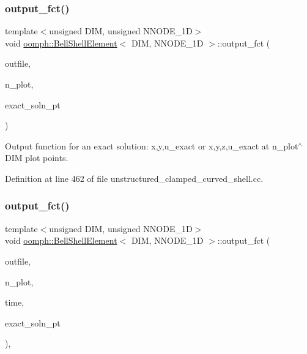 \subsubsection{\texorpdfstring{output\+\_\+fct()}{output\_fct()}\hspace{0.1cm}{\footnotesize\ttfamily [1/2]}}
{\footnotesize\ttfamily template$<$unsigned D\+IM, unsigned N\+N\+O\+D\+E\+\_\+1D$>$ \\
void \hyperlink{classoomph_1_1BellShellElement}{oomph\+::\+Bell\+Shell\+Element}$<$ D\+IM, N\+N\+O\+D\+E\+\_\+1D $>$\+::output\+\_\+fct (\begin{DoxyParamCaption}\item[{std\+::ostream \&}]{outfile,  }\item[{const unsigned \&}]{n\+\_\+plot,  }\item[{Finite\+Element\+::\+Steady\+Exact\+Solution\+Fct\+Pt}]{exact\+\_\+soln\+\_\+pt }\end{DoxyParamCaption})\hspace{0.3cm}{\ttfamily [inline]}}



Output function for an exact solution\+: x,y,u\+\_\+exact or x,y,z,u\+\_\+exact at n\+\_\+plot$^\wedge$\+D\+IM plot points. 



Definition at line 462 of file unstructured\+\_\+clamped\+\_\+curved\+\_\+shell.\+cc.

\mbox{\label{classoomph_1_1BellShellElement_a5589f860978d78c64278afdbc72f5f5d}} 
\subsubsection{\texorpdfstring{output\+\_\+fct()}{output\_fct()}\hspace{0.1cm}{\footnotesize\ttfamily [2/2]}}
{\footnotesize\ttfamily template$<$unsigned D\+IM, unsigned N\+N\+O\+D\+E\+\_\+1D$>$ \\
void \hyperlink{classoomph_1_1BellShellElement}{oomph\+::\+Bell\+Shell\+Element}$<$ D\+IM, N\+N\+O\+D\+E\+\_\+1D $>$\+::output\+\_\+fct (\begin{DoxyParamCaption}\item[{std\+::ostream \&}]{outfile,  }\item[{const unsigned \&}]{n\+\_\+plot,  }\item[{const double \&}]{time,  }\item[{Finite\+Element\+::\+Unsteady\+Exact\+Solution\+Fct\+Pt}]{exact\+\_\+soln\+\_\+pt }\end{DoxyParamCaption})\hspace{0.3cm}{\ttfamily [inline]}, {\ttfamily [virtual]}}



